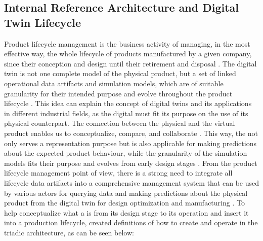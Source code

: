 \subsection{Internal Reference Architecture and Digital Twin Lifecycle}
\label{sec:internal_reference_and_dt_lifecycle}
Product lifecycle management is the business activity of managing, in the most effective way, the whole lifecycle of products
manufactured by a given company, since their conception and design until their retirement and disposal \cite{Tao2017PLM}.
The digital twin is not one complete model of the physical product, but a set of linked operational data artifacts and
simulation models, which are of suitable granularity for their intended purpose and evolve throughout the product 
lifecycle \cite{Schleich2017}. This idea can explain the concept of digital twins and its applications in different industrial fields,
as the digital must fit its purpose on the use of its physical counterpart. The connection between the physical and the virtual
product enables us to conceptualize, compare, and collaborate \cite{Grieves2014}. This way, the \DT not only serves a 
representation purpose but is also applicable for making predictions about the expected product behaviour, while the granularity 
of the simulation models fits their purpose and evolves from early design stages \cite{Schleich2017}. From the product lifecycle
management point of view, there is a strong need to integrate all lifecycle data artifacts into a comprehensive management system that
can be used by various actors for querying data and making predictions about the physical product from the digital twin for design
optimization and manufacturing \cite{Schleich2017}. To help conceptualize what a \DT is from its design stage to its operation and
insert it into a production lifecycle,  created definitions of how to create and operate \DTs in the triadic
architecture, as can be seen below:

